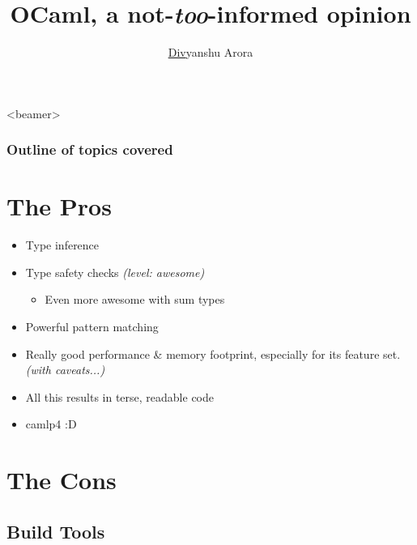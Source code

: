 \documentclass{beamer}
\title[OCaml, a not-\textit{too}-informed opinion]{
OCaml, a not-\textit{too}-informed opinion
}%
\author[Arora]{\underline{Div}yanshu Arora}
\institute[NUS]{
  \texttt{arora@comp.nus.edu.sg}
}
\begin{document}
\begin{frame}[plain]
  \titlepage
\end{frame}

\begin{frame}<beamer>
  \frametitle{Outline of topics covered}
  \tableofcontents
\end{frame}

\section{The Pros}
\label{sec:pro}

\begin{frame}{}
  \begin{itemize}
  \item Type inference
    \pause
  \item Type safety checks \textit{(level: awesome)}
    \pause
    \begin{itemize}
    \item Even more awesome with sum types
    \end{itemize}
    \pause
  \item Powerful pattern matching
    \pause
  \item Really good performance \& memory footprint, especially for
    its feature set. \textit{(with caveats...)}
    \pause
  \item All this results in terse, readable code
    \pause
  \item camlp4 :D
  \end{itemize}
\end{frame}

\section{The Cons}
\label{sec:downside}

\subsection{Build Tools}
\end{document}

